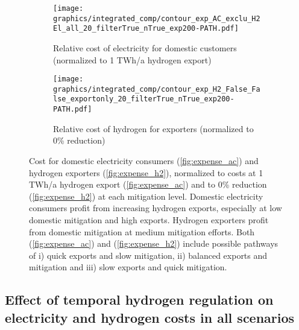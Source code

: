 \begin{figure*}[h!]
    \centering
    \begin{subfigure}[b]{0.49\linewidth}
        \centering
        \texttt{[image: graphics/integrated\_comp/contour\_exp\_AC\_exclu\_H2 El\_all\_20\_filterTrue\_nTrue\_exp200-PATH.pdf]}
        \caption{Relative cost of electricity for domestic customers (normalized to 1 TWh/a hydrogen export)}
        \label{fig:expense_ac_200}
    \end{subfigure}
    \hfill
    \begin{subfigure}[b]{0.49\linewidth}
        \centering
        \texttt{[image: graphics/integrated\_comp/contour\_exp\_H2\_False\_False\_exportonly\_20\_filterTrue\_nTrue\_exp200-PATH.pdf]}
        \caption{Relative cost of hydrogen for exporters (normalized to 0\% \co reduction)}
        \label{fig:expense_h2_200}
    \end{subfigure}
    \hfill
    \caption{  
    Cost for domestic electricity consumers (\ref{fig:expense_ac}) and hydrogen exporters (\ref{fig:expense_h2}),
    normalized to costs at 1 TWh/a hydrogen export (\ref{fig:expense_ac}) and
    to 0\% \co reduction (\ref{fig:expense_h2})
    at each mitigation level. Domestic electricity consumers profit from increasing hydrogen exports, especially at low domestic mitigation and high exports. Hydrogen exporters profit from domestic mitigation at medium mitigation efforts. Both (\ref{fig:expense_ac}) and (\ref{fig:expense_h2}) include possible pathways of i) quick exports and slow mitigation, ii) balanced exports and mitigation and iii) slow exports and quick mitigation.}
    \label{fig:expenses_default_200}
\end{figure*}


\subsection{Effect of temporal hydrogen regulation on electricity and hydrogen costs in all scenarios} 

